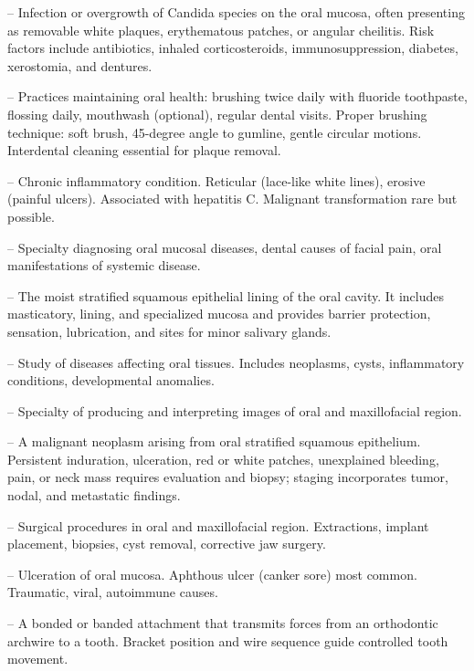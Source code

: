 -- Infection or overgrowth of Candida species on the oral mucosa, often presenting as removable white plaques, erythematous patches, or angular cheilitis. Risk factors include antibiotics, inhaled corticosteroids, immunosuppression, diabetes, xerostomia, and dentures.

-- Practices maintaining oral health: brushing twice daily with fluoride toothpaste, flossing daily, mouthwash (optional), regular dental visits. Proper brushing technique: soft brush, 45-degree angle to gumline, gentle circular motions. Interdental cleaning essential for plaque removal.

-- Chronic inflammatory condition. Reticular (lace-like white lines), erosive (painful ulcers). Associated with hepatitis C. Malignant transformation rare but possible.

-- Specialty diagnosing oral mucosal diseases, dental causes of facial pain, oral manifestations of systemic disease.

-- The moist stratified squamous epithelial lining of the oral cavity. It includes masticatory, lining, and specialized mucosa and provides barrier protection, sensation, lubrication, and sites for minor salivary glands.

-- Study of diseases affecting oral tissues. Includes neoplasms, cysts, inflammatory conditions, developmental anomalies.

-- Specialty of producing and interpreting images of oral and maxillofacial region.

-- A malignant neoplasm arising from oral stratified squamous epithelium. Persistent induration, ulceration, red or white patches, unexplained bleeding, pain, or neck mass requires evaluation and biopsy; staging incorporates tumor, nodal, and metastatic findings.

-- Surgical procedures in oral and maxillofacial region. Extractions, implant placement, biopsies, cyst removal, corrective jaw surgery.

-- Ulceration of oral mucosa. Aphthous ulcer (canker sore) most common. Traumatic, viral, autoimmune causes.

-- A bonded or banded attachment that transmits forces from an orthodontic archwire to a tooth. Bracket position and wire sequence guide controlled tooth movement.


